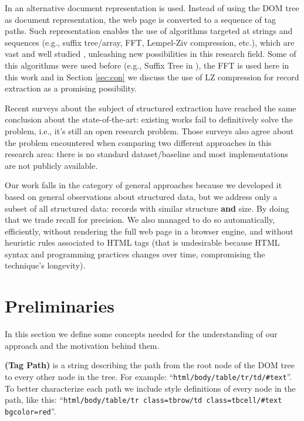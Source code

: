 \documentclass{vldb}
\begin{document}
In \cite{TPC09, SuffixTree12, TPS2013} an alternative document representation is
used. Instead of using the DOM tree as document representation, the web page
is converted to a sequence of tag paths. Such representation enables the use of
algorithms targeted at strings and sequences (e.g., suffix
tree/array\cite{ukkonen1995, manber1993suffix}, FFT\cite{fft1965}, Lempel-Ziv
compression\cite{ziv1977universal}, etc.), which are vast and well studied
\cite{gusfield1997algorithms}, unleashing new possibilities in this research
field. Some of this algorithms were used before (e.g., Suffix Tree in
\cite{SuffixTree12}), the FFT is used here in this work and in Section
\ref{sec:con} we discuss the use of LZ compression for record extraction as a
promising possibility.

Recent surveys\cite{survey2013, survey2014} about the subject of structured
extraction have reached the same conclusion about the state-of-the-art: existing
works fail to definitively solve the problem, i.e., it's still an open research
problem. Those surveys also agree about the problem encountered when comparing
two different approaches in this research area: there is no standard
dataset/baseline and most implementations are not publicly available.

Our work falls in the category of general approaches because we developed it
based on general observations about structured data, but we address only a
subset of all structured data: records with similar structure \textbf{and} size.
By doing that we trade recall for precision. We also managed to do so
automatically, efficiently, without rendering the full web page in a browser
engine, and without heuristic rules associated to HTML tags (that is undesirable
because HTML syntax and programming practices changes over time, compromising
the technique's longevity).

\section{Preliminaries}\label{sec:defs}
In this section we define some concepts needed for the understanding of our
approach and the motivation behind them.

\begin{definition}\textbf{(Tag Path)} is a string describing the path from the
root node of the DOM tree to every other node in the tree. For example:
``\texttt{html/body/table/tr/td/\#text}''. To better characterize each path we
include style definitions of every node in the path, like this:
``\texttt{html/body/table/tr class=tbrow/td class=tbcell/\#text bgcolor=red}''.
\end{definition}
\end{document}
